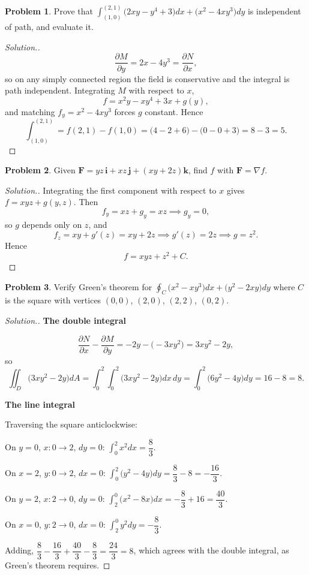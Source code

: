 \documentclass[11pt,a4paper]{article}
\theoremstyle{definition}
\newtheorem{problemx}{Problem}[subsection]
\newenvironment{problem}{\begin{problemx}}{\end{problemx}}
\newenvironment{solution}
  {\renewcommand{\qedsymbol}{}\begin{proof}[\textit{Solution}.]}
  {\end{proof}}
\newcommand{\subhead}[1]{%
  \par\medskip\noindent\textbf{#1}\par\nobreak\smallskip}
\begin{document}
\begin{problem}
Prove that
$\displaystyle{\int_{(1,0)}^{(2,1)}\big(2xy-y^4+3\big)dx
+ \big(x^2-4xy^3\big)dy}$ is independent of path, and evaluate it.
\end{problem}
\begin{solution}
$$\frac{\partial M}{\partial y} = 2x-4y^3 = \frac{\partial N}{\partial x},$$
so on any simply connected region the field is conservative and the integral is
path independent. Integrating $M$ with respect to $x$,
$$f = x^2y - xy^4 + 3x + g(y),$$
and matching $f_y = x^2-4xy^3$ forces $g$ constant. Hence
$$\int_{(1,0)}^{(2,1)} = f(2,1)-f(1,0)
= \big(4-2+6\big) - \big(0-0+3\big) = 8-3 = 5 .$$
\end{solution}

\begin{problem}
Given $\textbf{F} = yz\,\textbf{i} + xz\,\textbf{j} + (xy+2z)\textbf{k}$, find
$f$ with $\textbf{F} = \nabla f$.
\end{problem}
\begin{solution}
Integrating the first component with respect to $x$ gives
$f = xyz + g(y,z)$. Then
$$f_y = xz + g_y = xz \implies g_y = 0 ,$$
so $g$ depends only on $z$, and
$$f_z = xy + g'(z) = xy+2z \implies g'(z) = 2z \implies g = z^2 .$$
Hence
$$f = xyz + z^2 + C .$$
\end{solution}

\begin{problem}
Verify Green's theorem for
$\displaystyle{\oint_C\big(x^2-xy^3\big)dx + \big(y^2-2xy\big)dy}$ where $C$ is
the square with vertices $(0,0)$, $(2,0)$, $(2,2)$, $(0,2)$.
\end{problem}
\begin{solution}
\subhead{The double integral}
$$\frac{\partial N}{\partial x} - \frac{\partial M}{\partial y}
= -2y - \big(-3xy^2\big) = 3xy^2 - 2y ,$$
so
$$\iint_D\big(3xy^2-2y\big)dA
= \int_0^2\int_0^2\big(3xy^2-2y\big)dx\,dy
= \int_0^2\big(6y^2-4y\big)dy = 16-8 = 8 .$$

\subhead{The line integral}
Traversing the square anticlockwise:

On $y=0$, $x: 0\rightarrow 2$, $dy=0$: $\int_0^2x^2dx = \dfrac83$.

On $x=2$, $y: 0\rightarrow 2$, $dx=0$:
$\int_0^2\big(y^2-4y\big)dy = \dfrac83-8 = -\dfrac{16}{3}$.

On $y=2$, $x: 2\rightarrow 0$, $dy=0$:
$\int_2^0\big(x^2-8x\big)dx = -\dfrac83+16 = \dfrac{40}{3}$.

On $x=0$, $y: 2\rightarrow 0$, $dx=0$:
$\int_2^0y^2dy = -\dfrac83$.

Adding, $\dfrac83 - \dfrac{16}{3} + \dfrac{40}{3} - \dfrac83 = \dfrac{24}{3}
= 8$, which agrees with the double integral, as Green's theorem requires.
\end{solution}
\end{document}
